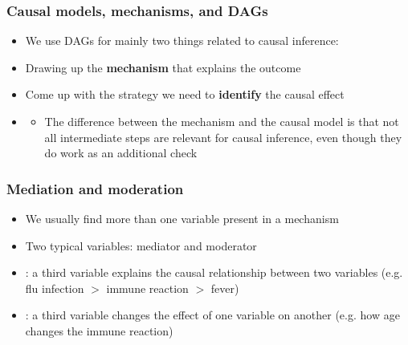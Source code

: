 \documentclass[aspectratio=43]{beamer}
\begin{document}
\begin{frame}
\frametitle{Causal models, mechanisms, and DAGs}
\centering

\begin{itemize}
  \item[] We use DAGs for mainly two things related to causal inference:
  \item Drawing up the \textbf{mechanism} that explains the outcome
  \item Come up with the strategy we need to \textbf{identify} the causal effect
  \item[]
  \begin{itemize}
    \item<2-> The difference between the mechanism and the causal model is that not all intermediate steps are relevant for causal inference, even though they do work as an additional check
  \end{itemize}
\end{itemize}

\end{frame}

\begin{frame}
\frametitle{Mediation and moderation}
\centering

\begin{itemize}
\item We usually find more than one variable present in a mechanism
\item Two typical variables: mediator and moderator
\item {}: a third variable explains the causal relationship between two variables (e.g. flu infection $>$ immune reaction $>$ fever)
\item {}: a third variable changes the effect of one variable on another (e.g. how age changes the immune reaction)
\end{itemize}

\end{frame}
\end{document}
